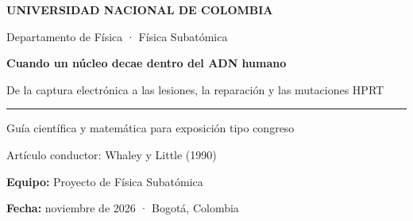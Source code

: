 \documentclass[11pt,a4paper]{article}
\begin{document}
\begin{titlepage}
\color{navy}\vspace*{1.7cm}
{\sffamily\bfseries\Large UNIVERSIDAD NACIONAL DE COLOMBIA\par}
{\sffamily Departamento de Física · Física Subatómica\par}\vspace{2.2cm}
{\Huge\bfseries Cuando un núcleo decae dentro del ADN humano\par}\vspace{.55cm}
{\Large De la captura electrónica a las lesiones, la reparación y las mutaciones HPRT\par}
\vspace{1.4cm}\color{teal}\rule{\textwidth}{1.5pt}\color{navy}\vspace{.75cm}
{\large Guía científica y matemática para exposición tipo congreso\par}
{\large Artículo conductor: Whaley y Little (1990)\par}
\vfill
\textbf{Equipo:} Proyecto de Física Subatómica\par
\textbf{Fecha:} noviembre de 2026 · Bogotá, Colombia\par
\vspace{1cm}{\footnotesize Las figuras audiovisuales incluidas son esquemas y modelos propios; no son microfotografías ni datos de pacientes.}
\end{titlepage}
\begin{abstract}
¿Por qué el mismo radionúclido puede cambiar su efecto biológico al pasar de un medio extracelular al ADN? Resolvemos esta pregunta con la comparación experimental de Whaley y Little entre las líneas linfoblastoides humanas TK6 y SE30 expuestas a iododesoxiuridina marcada con $^{125}$I o $^{131}$I \cite{whaley}. Separamos cuatro niveles: el proceso nuclear que origina las radiaciones; la probabilidad de que el átomo decaiga mientras permanece en ADN; la geometría de las lesiones moleculares; y la selección experimental de mutantes HPRT. Derivamos las leyes de desintegración, un modelo de permanencia con riesgos competitivos, una regla geométrica de rotura doble y un modelo de destinos celulares. La única pendiente de mutación usada como cifra observada es $0.45\times10^{-6}$ mutantes inducidos por cGy para $^{131}$IUdR en TK6 \cite{whaley}. Las simulaciones de lesiones y reparación exploran hipótesis declaradas; no predicen el riesgo de una persona. La entrega incluye código, resultados y seis vídeos narrativos aptos para proyección.
\end{abstract}
\tableofcontents\clearpage
\end{document}
